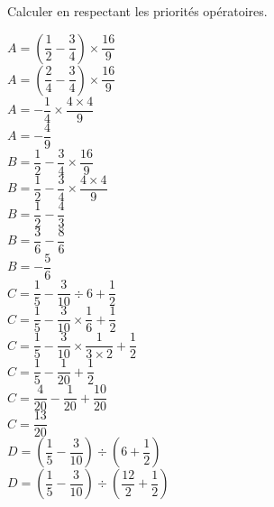 \begin{corrige}
    Calculer en respectant les priorités opératoires.
            \begin{spacing}{1.5}
                \begin{itemize}
                    \def\item{}
                    \item $A=\left(\dfrac{1}{2}-\dfrac{3}{4}\right)\times\dfrac{16}{9}$\\
                    {\red $A=\left(\dfrac{2}{4}-\dfrac{3}{4}\right)\times\dfrac{16}{9}$}\\
                    {\red $A=-\dfrac{1}{4}\times\dfrac{4\times 4}{9}$}\\
                    {\red $A=-\dfrac{4}{9}$}\\
                    \item $B=\dfrac{1}{2}-\dfrac{3}{4}\times\dfrac{16}{9}$\\
                    {\red $B=\dfrac{1}{2}-\dfrac{3}{4}\times\dfrac{4\times 4}{9}$}\\
                    {\red $B=\dfrac{1}{2}-\dfrac{4}{3}$}\\
                    {\red $B=\dfrac{3}{6}-\dfrac{8}{6}$}\\
                    {\red $B=-\dfrac{5}{6}$}\\
                    \item $C=\dfrac{1}{5}-\dfrac{3}{10}\div 6+\dfrac{1}{2}$\\
                    {\red $C=\dfrac{1}{5}-\dfrac{3}{10}\times\dfrac{1}{6}+\dfrac{1}{2}$}\\
                    {\red $C=\dfrac{1}{5}-\dfrac{3}{10}\times\dfrac{1}{3\times 2}+\dfrac{1}{2}$}\\
                    {\red $C=\dfrac{1}{5}-\dfrac{1}{20}+\dfrac{1}{2}$}\\
                    {\red $C=\dfrac{4}{20}-\dfrac{1}{20}+\dfrac{10}{20}$}\\
                    {\red $C=\dfrac{13}{20}$}\\
                    \item $D=\left(\dfrac{1}{5}-\dfrac{3}{10}\right)\div\left(6+\dfrac{1}{2}\right)$\\
                    {\red $D=\left(\dfrac{1}{5}-\dfrac{3}{10}\right)\div\left(\dfrac{12}{2}+\dfrac{1}{2}\right)$}\\

\end{itemize}
\end{spacing}
\end{corrige}
